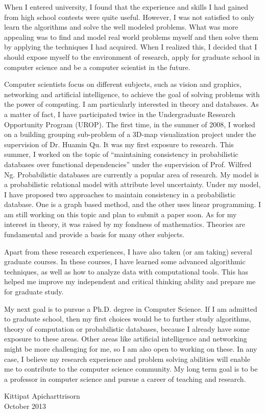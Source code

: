 \documentclass[10pt]{report}
\begin{document}
\vspace{0.2cm}
When I entered university, I found that the experience and skills I had gained from high school contests were quite useful. However, I was not satisfied to only learn the algorithms and solve the well modeled problems. What was more appealing was to find and model real world problems myself and then solve them by applying the techniques I had acquired. When I realized this, I decided that I should expose myself to the environment of research, apply for graduate school in computer science and be a computer scientist in the future.

\vspace{0.2cm}
Computer scientists focus on different subjects, such as vision and graphics, networking and artificial intelligence, to achieve the goal of solving problems with the power of computing. I am particularly interested in theory and databases. As a matter of fact, I have participated twice in the Undergraduate Research Opportunity Program (UROP). The first time, in the summer of 2008, I worked on a building grouping sub-problem of a 3D-map visualization project under the supervision of Dr. Huamin Qu. It was my first exposure to research. This summer, I worked on the topic of “maintaining consistency in probabilistic databases over functional dependencies” under the supervision of Prof. Wilfred Ng. Probabilistic databases are currently a popular area of research. My model is a probabilistic relational model with attribute level uncertainty. Under my model, I have proposed two approaches to maintain consistency in a probabilistic database. One is a graph based method, and the other uses linear programming. I am still working on this topic and plan to submit a paper soon. As for my interest in theory, it was raised by my fondness of mathematics. Theories are fundamental and provide a basis for many other subjects.

\vspace{0.2cm}
Apart from these research experiences, I have also taken (or am taking) several graduate courses. In these courses, I have learned some advanced algorithmic techniques, as well as how to analyze data with computational tools. This has helped me improve my independent and critical thinking ability and prepare me for graduate study.

\vspace{0.2cm}
My next goal is to pursue a Ph.D. degree in Computer Science. If I am admitted to graduate school, then my first choices would be to further study algorithms, theory of computation or probabilistic databases, because I already have some exposure to these areas. Other areas like artificial intelligence and networking might be more challenging for me, so I am also open to working on these. In any case, I believe my research experience and problem solving abilities will enable me to contribute to the computer science community. My long term goal is to be a professor in computer science and pursue a career of teaching and research.

\vspace{1cm}
\raggedleft Kittipat Apicharttrisorn
\\  October 2013
\end{document}
